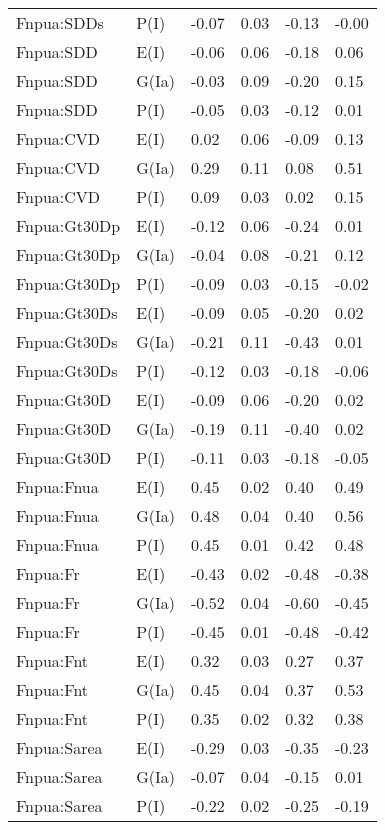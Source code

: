 \begin{center}
\begin{longtable}{|p{1.1in}|p{0.7in}|p{0.7in}|p{0.6in}|p{0.6in}|p{0.6in}|}
  Fnpua:SDDs & P(I) & -0.07 & 0.03 & -0.13 & -0.00 \\ 
  Fnpua:SDD & E(I) & -0.06 & 0.06 & -0.18 & 0.06 \\ 
  Fnpua:SDD & G(Ia) & -0.03 & 0.09 & -0.20 & 0.15 \\ 
  Fnpua:SDD & P(I) & -0.05 & 0.03 & -0.12 & 0.01 \\ 
  Fnpua:CVD & E(I) & 0.02 & 0.06 & -0.09 & 0.13 \\ 
  Fnpua:CVD & G(Ia) & 0.29 & 0.11 & 0.08 & 0.51 \\ 
  Fnpua:CVD & P(I) & 0.09 & 0.03 & 0.02 & 0.15 \\ 
  Fnpua:Gt30Dp & E(I) & -0.12 & 0.06 & -0.24 & 0.01 \\ 
  Fnpua:Gt30Dp & G(Ia) & -0.04 & 0.08 & -0.21 & 0.12 \\ 
  Fnpua:Gt30Dp & P(I) & -0.09 & 0.03 & -0.15 & -0.02 \\ 
  Fnpua:Gt30Ds & E(I) & -0.09 & 0.05 & -0.20 & 0.02 \\ 
  Fnpua:Gt30Ds & G(Ia) & -0.21 & 0.11 & -0.43 & 0.01 \\ 
  Fnpua:Gt30Ds & P(I) & -0.12 & 0.03 & -0.18 & -0.06 \\ 
  Fnpua:Gt30D & E(I) & -0.09 & 0.06 & -0.20 & 0.02 \\ 
  Fnpua:Gt30D & G(Ia) & -0.19 & 0.11 & -0.40 & 0.02 \\ 
  Fnpua:Gt30D & P(I) & -0.11 & 0.03 & -0.18 & -0.05 \\ 
  Fnpua:Fnua & E(I) & 0.45 & 0.02 & 0.40 & 0.49 \\ 
  Fnpua:Fnua & G(Ia) & 0.48 & 0.04 & 0.40 & 0.56 \\ 
  Fnpua:Fnua & P(I) & 0.45 & 0.01 & 0.42 & 0.48 \\ 
  Fnpua:Fr & E(I) & -0.43 & 0.02 & -0.48 & -0.38 \\ 
  Fnpua:Fr & G(Ia) & -0.52 & 0.04 & -0.60 & -0.45 \\ 
  Fnpua:Fr & P(I) & -0.45 & 0.01 & -0.48 & -0.42 \\ 
  Fnpua:Fnt & E(I) & 0.32 & 0.03 & 0.27 & 0.37 \\ 
  Fnpua:Fnt & G(Ia) & 0.45 & 0.04 & 0.37 & 0.53 \\ 
  Fnpua:Fnt & P(I) & 0.35 & 0.02 & 0.32 & 0.38 \\ 
  Fnpua:Sarea & E(I) & -0.29 & 0.03 & -0.35 & -0.23 \\ 
  Fnpua:Sarea & G(Ia) & -0.07 & 0.04 & -0.15 & 0.01 \\ 
  Fnpua:Sarea & P(I) & -0.22 & 0.02 & -0.25 & -0.19 \\ 

\end{longtable}
\end{center}
